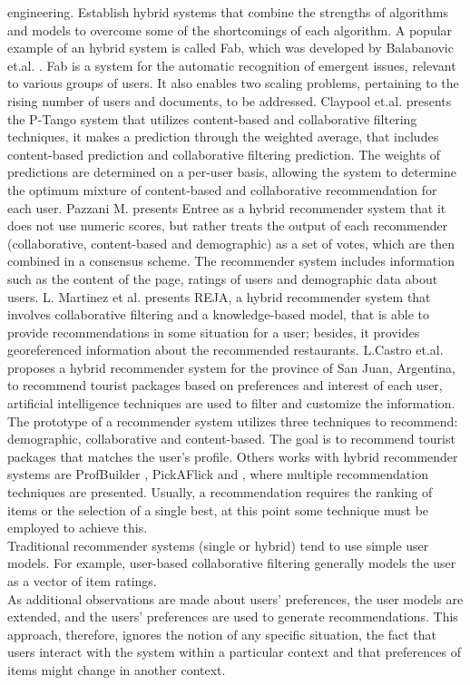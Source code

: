 engineering. Establish hybrid systems that combine the strengths of
algorithms and models to overcome some of the shortcomings of
each algorithm.
A popular example of an hybrid system is called Fab, which was
developed by  Balabanovic et.al. \cite{balabanovic1997fab}. Fab is a
system  for the automatic recognition of emergent issues, relevant to
various  groups of users. It also enables two scaling problems,
pertaining to the rising number of users and documents, to be
addressed.  Claypool et.al. \cite{claypool1999combining}  presents the
P-Tango system that utilizes content-based and collaborative filtering
techniques, it makes a prediction through the weighted average, that
includes content-based prediction and collaborative filtering
prediction. The weights of predictions are determined on a per-user
basis, allowing the system to determine the optimum mixture of
content-based and collaborative recommendation for each user. Pazzani
M. \cite{pazzani1999framework} presents Entree as a hybrid recommender
system that it does not use numeric scores, but rather treats the
output of each recommender (collaborative, content-based and
demographic) as a set of votes, which are then combined in a consensus
scheme. The recommender system includes information such as the
content of the page, ratings of users and demographic data about
users.
L. Martinez et al. \cite{martinez2009reja} presents REJA, a hybrid
recommender system that involves collaborative filtering and a
knowledge-based model, that is able to provide recommendations in some
situation for a user; besides, it provides georeferenced information
about the recommended restaurants.
L.Castro et.al. \cite{castro2012prototype} proposes  
a hybrid recommender system for the province of San Juan, Argentina, 
to recommend tourist packages  based on preferences and interest 
of each user, artificial intelligence
techniques are used to filter and customize the information. The
prototype of a recommender system utilizes three techniques to
recommend: demographic, collaborative and content-based. The goal is
to recommend tourist packages that matches the user's profile.
Others works with hybrid recommender systems are ProfBuilder
  \cite{al1999semantic}, PickAFlick \cite{burke1999integrating}  and
  \cite{tran2000hybrid}, where multiple recommendation
techniques are presented. Usually, a recommendation requires the ranking of
items or the selection of a single best, at this point some
technique must be employed to achieve this. \\ 
Traditional recommender systems (single or hybrid) tend to use
simple user models. For example, user-based collaborative filtering
generally models the user as a vector of item ratings. \\ As additional
observations are made about users' preferences, the user models are
extended, and the users' preferences are used to generate
recommendations. This approach, therefore, ignores the notion of any
specific situation, the fact that users interact with the system
within a particular context and  that preferences of items might 
change in another context. 

